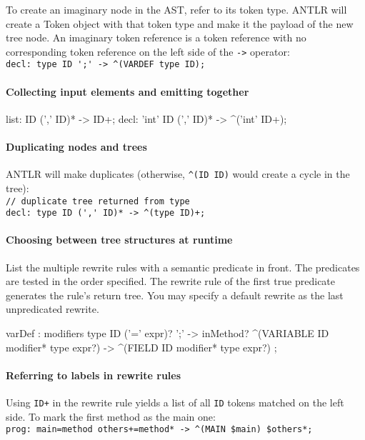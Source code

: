 To create an imaginary node in the AST, refer to its token type.
ANTLR will create a Token object with that token type
and make it the payload of the new tree node.
An imaginary token reference is a token reference
with no corresponding token reference
on the left side of the \verb=->= operator:\\
\verb=decl: type ID ';' -> ^(VARDEF type ID);=

\paragraph{Collecting input elements and emitting together}
\begin{verbatimtab}
list: ID (',' ID)* -> ID+;
decl: 'int' ID (',' ID)* -> ^('int' ID+);
\end{verbatimtab}

\paragraph{Duplicating nodes and trees}
ANTLR will make duplicates
(otherwise, \verb=^(ID ID)= would create a cycle in the tree):\\
\verb=// duplicate tree returned from type=\\
\verb=decl: type ID (',' ID)* -> ^(type ID)+;=

\paragraph{Choosing between tree structures at runtime}
List the multiple rewrite rules with a semantic predicate in front.
The predicates are tested in the order specified.
The rewrite rule of the first true predicate generates the rule's return tree.
You may specify a default rewrite as the last unpredicated rewrite.
\begin{verbatimtab}
varDef	: modifiers type ID ('=' expr)? ';'
	-> {inMethod}?	^(VARIABLE ID modifier* type expr?)
	->		^(FIELD ID modifier* type expr?)
	;
\end{verbatimtab}

\paragraph{Referring to labels in rewrite rules}
Using \verb=ID+= in the rewrite rule yields a list of all \verb=ID= tokens
matched on the left side.
To mark the first method as the main one:\\
\verb|prog: main=method others+=method* -> ^(MAIN $main) $others*;|

